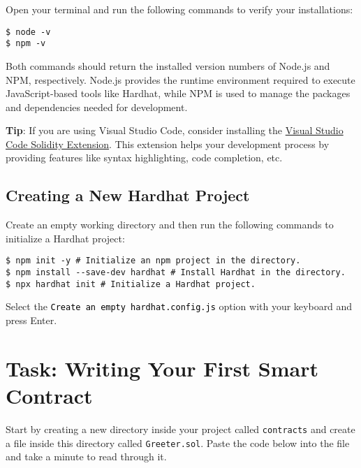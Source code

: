 \documentclass[12pt]{article}
\newcommand{\codegrey}[1]{%
  \texttt{\colorbox{black!4}{\textcolor{black}{#1}}}%
}
\begin{document}
\noindent
Open your terminal and run the following commands to verify your installations:

\begin{verbatim}
$ node -v
$ npm -v
\end{verbatim}

\noindent
Both commands should return the installed version numbers of Node.js and NPM, respectively. Node.js provides the runtime environment required to execute JavaScript-based tools like Hardhat, while NPM is used to manage the packages and dependencies needed for development.

\medskip
\noindent
\textbf{Tip}: If you are using Visual Studio Code, consider installing the \href{https://marketplace.visualstudio.com/items?itemName=JuanBlanco.solidity}{Visual Studio Code Solidity Extension}. This extension helps your development process by providing features like syntax highlighting, code completion, etc.

\subsection{Creating a New Hardhat Project}

Create an empty working directory and then run the following commands to
initialize a Hardhat project:

\begin{verbatim}
$ npm init -y # Initialize an npm project in the directory.
$ npm install --save-dev hardhat # Install Hardhat in the directory.
$ npx hardhat init # Initialize a Hardhat project.
\end{verbatim}
Select the \codegrey{Create an empty hardhat.config.js} option with your keyboard
and press Enter.

\section{Task: Writing Your First Smart Contract}

Start by creating a new directory inside your project called \texttt{contracts}
and create a file inside this directory called \texttt{Greeter.sol}. Paste the
code below into the file and take a minute to read through it.
\end{document}
